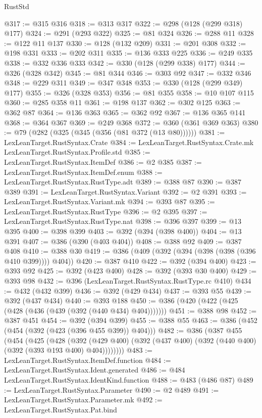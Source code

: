 \begin{lexlean}{RustStd}
\begin{coremodule}
@317 := @315 @316
@318 := @313 @317
@322 := @298 (@128 (@299 @318) @177)
@324 := @291 (@293 @322)
@325 := @81 @324
@326 := @288 @11
@328 := @122 @11 @137
@330 := @128 (@132 @209)
@331 := @201 @308
@332 := @198 @331
@333 := @202 @311
@335 := @136 @333 @225
@336 := @249 @335
@338 := @332 @336 @333
@342 := @330 (@128 (@299 @338) @177)
@344 := @326 (@328 @342)
@345 := @81 @344
@346 := @303 @92
@347 := @332 @346
@348 := @229 @311
@349 := @347 @348
@353 := @330 (@128 (@299 @349) @177)
@355 := @326 (@328 @353)
@356 := @81 @355
@358 := @10 @107 @115
@360 := @285 @358 @11
@361 := @198 @137
@362 := @302 @125
@363 := @362 @87
@364 := @136 @363
@365 := @362 @92
@367 := @136 @365 @141
@368 := @364 @367
@369 := @249 @368
@372 := @360 (@361 @369 @363)
@380 := @79 (@282 (@325 (@345 (@356 (@81 @372 (@13 @80))))))
@381 := LexLeanTarget.RustSyntax.Crate
@384 := LexLeanTarget.RustSyntax.Crate.mk LexLeanTarget.RustSyntax.Profile.std
@385 := LexLeanTarget.RustSyntax.ItemDef
@386 := @2 @385
@387 := LexLeanTarget.RustSyntax.ItemDef.enum
@388 := LexLeanTarget.RustSyntax.RustType.adt
@389 := @388 @87
@390 := @387 @389
@391 := LexLeanTarget.RustSyntax.Variant
@392 := @2 @391
@393 := LexLeanTarget.RustSyntax.Variant.mk
@394 := @393 @87
@395 := LexLeanTarget.RustSyntax.RustType
@396 := @2 @395
@397 := LexLeanTarget.RustSyntax.RustType.nat
@398 := @396 @397
@399 := @13 @395
@400 := @398 @399
@403 := @392 (@394 (@398 @400))
@404 := @13 @391
@407 := @386 (@390 (@403 @404))
@408 := @388 @92
@409 := @387 @408
@410 := @388 @30
@419 := @386 (@409 (@392 (@394 (@398 (@398 (@396 @410 @399)))) @404))
@420 := @387 @410
@422 := @392 (@394 @400)
@423 := @393 @92
@425 := @392 (@423 @400)
@428 := @392 (@393 @30 @400)
@429 := @393 @98
@432 := @396 (LexLeanTarget.RustSyntax.RustType.rc @410)
@434 := @432 (@432 @399)
@436 := @392 (@429 @434)
@437 := @393 @55
@439 := @392 (@437 @434)
@440 := @393 @188
@450 := @386 (@420 (@422 (@425 (@428 (@436 (@439 (@392 (@440 @434) @404)))))))
@451 := @388 @98
@452 := @387 @451
@454 := @392 (@394 @399)
@455 := @388 @55
@463 := @386 (@452 (@454 (@392 (@423 (@396 @455 @399)) @404)))
@482 := @386
    (@387
      @455
      (@454
        (@425
          (@428
            (@392
              (@429 @400)
              (@392 (@437 @400) (@392 (@440 @400) (@392 (@393 @193 @400) @404))))))))
@483 := LexLeanTarget.RustSyntax.ItemDef.function
@484 := LexLeanTarget.RustSyntax.Ident.generated
@486 := @484 LexLeanTarget.RustSyntax.IdentKind.function
@488 := @483 (@486 @87)
@489 := LexLeanTarget.RustSyntax.Parameter
@490 := @2 @489
@491 := LexLeanTarget.RustSyntax.Parameter.mk
@492 := LexLeanTarget.RustSyntax.Pat.bind

\end{coremodule}
\end{lexlean}
